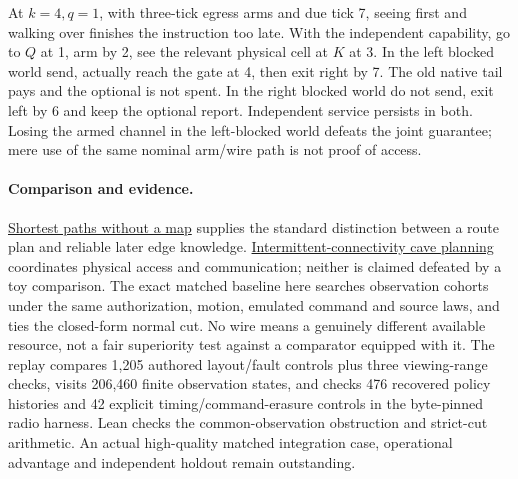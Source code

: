 \documentclass[11pt]{article}
\begin{document}
At $k=4,q=1$, with three-tick egress arms and due tick 7,
seeing first and walking over finishes the instruction too
late. With the independent capability, go to $Q$ at 1, arm
by 2, see the relevant physical cell at $K$ at 3. In the left
blocked world send, actually reach the gate at 4, then
exit right by 7. The old native tail pays and the optional
is not spent. In the right blocked world do not send,
exit left by 6 and keep the optional report. Independent
service persists in both. Losing the armed channel in the
left-blocked world defeats the joint guarantee; mere use
of the same nominal arm/wire path is not proof of access.

\paragraph{Comparison and evidence.}
\href{https://sites.cs.ucsb.edu/~suri/cs235/Rlist/noMapNavigation.pdf}
{Shortest paths without a map} supplies the standard distinction
between a route plan and reliable later edge knowledge.
\href{https://superintelligence.jpl.nasa.gov/public/documents/papers/PlanRob-2020-Planning-and-Optimization-for-Multi-Robot-Planetary-Cave-Exploration.pdf}
{Intermittent-connectivity cave planning} coordinates physical access
and communication; neither is claimed defeated by a toy comparison.
The exact matched baseline here searches observation cohorts under
the same authorization, motion, emulated command and source laws,
and ties the closed-form normal cut. No wire means a genuinely
different available resource, not a fair superiority test against
a comparator equipped with it.
The replay compares 1,205 authored layout/fault controls plus
three viewing-range checks, visits 206,460 finite observation
states, and checks 476 recovered policy histories and 42 explicit
timing/command-erasure controls in the byte-pinned radio harness.
Lean checks the common-observation obstruction and strict-cut
arithmetic. An actual high-quality matched integration case,
operational advantage and independent holdout remain outstanding.
\end{document}
